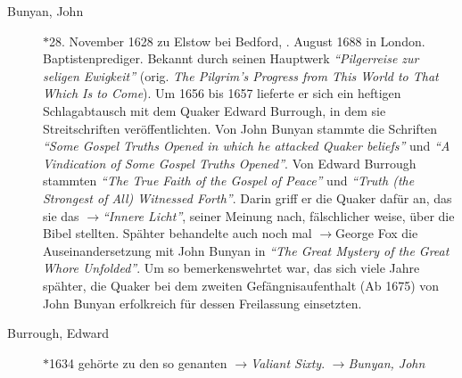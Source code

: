 \begin{description}
 \item[Bunyan, John] $\ast$28. November 1628 zu Elstow bei Bedford, .
August 1688 in London. Baptistenprediger. Bekannt durch seinen Hauptwerk
\textit{"`Pilgerreise zur seligen Ewigkeit"'} (orig. \textit{The Pilgrim’s
Progress from This World to That Which Is to Come}). Um 1656 bis 1657 lieferte
er sich ein heftigen Schlagabtausch mit dem Quaker Edward Burrough, in dem sie
Streitschriften veröffentlichten. Von John Bunyan stammte die Schriften
\textit{"`Some Gospel Truths Opened in which he attacked Quaker beliefs"'} und
\textit{"`A Vindication of Some Gospel Truths Opened"'}. Von Edward Burrough
stammten \textit{"`The True Faith of the Gospel of Peace"'} und \textit{"`Truth
(the Strongest of All) Witnessed Forth"'}. Darin griff er die Quaker dafür an,
das sie das $\to$\textit{"`Innere Licht"'}, seiner Meinung nach, fälschlicher
weise, über die Bibel stellten. Spähter behandelte auch noch mal $\to$George Fox
die Auseinandersetzung mit John Bunyan in \textit{"`The Great Mystery of the
Great Whore Unfolded"'}. Um so bemerkenswehrtet war, das sich viele Jahre
spähter, die Quaker bei dem zweiten Gefängnisaufenthalt (Ab 1675) von John
Bunyan erfolkreich für dessen Freilassung einsetzten.

 \item[Burrough, Edward] $\ast$1634  gehörte zu den so genanten
$\to$\textit{Valiant Sixty}. $\to$\textit{Bunyan, John}


 \end{description}

\normalsize

